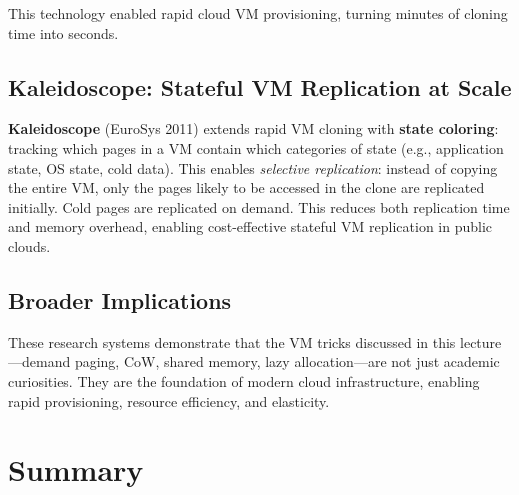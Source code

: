\documentclass[11pt]{article}
\begin{document}
This technology enabled rapid cloud VM provisioning, turning minutes of cloning time into seconds.

\subsection{Kaleidoscope: Stateful VM Replication at Scale}

\textbf{Kaleidoscope} (EuroSys 2011) extends rapid VM cloning with \textbf{state coloring}: tracking which pages in a VM contain which categories of state (e.g., application state, OS state, cold data). This enables \emph{selective replication}: instead of copying the entire VM, only the pages likely to be accessed in the clone are replicated initially. Cold pages are replicated on demand. This reduces both replication time and memory overhead, enabling cost-effective stateful VM replication in public clouds.

\subsection{Broader Implications}

These research systems demonstrate that the VM tricks discussed in this lecture---demand paging, CoW, shared memory, lazy allocation---are not just academic curiosities. They are the foundation of modern cloud infrastructure, enabling rapid provisioning, resource efficiency, and elasticity.

\section{Summary}
\end{document}
